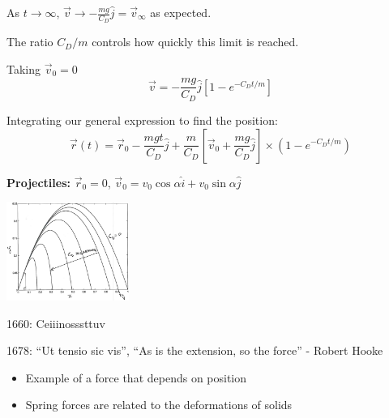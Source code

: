 \documentclass[10pt]{scrartcl}
\begin{document}
\begin{example}
As $t \to \infty$, $\vec{v} \to -\frac{mg}{C_D}\hat{j} = \vec{v}_{\infty}$ as expected.

The ratio $C_D/m$ controls how quickly this limit is reached. 

Taking $\vec{v}_0 = 0$
\[\vec{v} = -\frac{mg}{C_D}\hat{j}[1 - e^{-C_Dt/m}]\]
\begin{center}
	
\end{center}


Integrating our general expression to find the position:
\[\vec{r}(t) = \vec{r}_0 - \frac{mgt}{C_D}\hat{j} + \frac{m}{C_D}[\vec{v}_0 + \frac{mg}{C_D}\hat{j}]\times(1-e^{-C_Dt/m})\]
\end{example}


\textbf{Projectiles:} $\vec{r}_0 = 0$, $\vec{v}_0 = v_0\cos\alpha\hat{i} + v_0\sin\alpha\hat{j}$\\[4cm]

\begin{center}
\includegraphics[width=4cm]{drag.jpg}
\end{center}





1660: Ceiiinosssttuv 

1678: ``Ut tensio sic vis'', ``As is the extension, so the force'' - Robert Hooke


\begin{itemize}
  \item Example of a force that depends on position
  \item Spring forces are related to the deformations of solids
\end{itemize}
\end{document}
